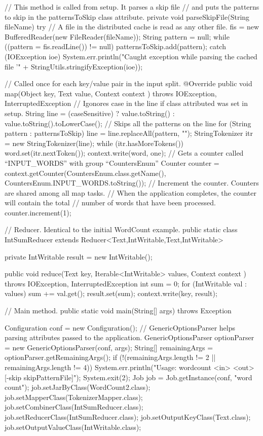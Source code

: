 \documentclass[11pt]{article}
\begin{document}
\begin{java}
{{    // This method is called from setup. It parses a skip file
    // and puts the patterns to skip in the patternsToSkip class attribute.   
    private void parseSkipFile(String fileName) {
      try {
        // A file in the distributed cache is read as any other file.
        fis = new BufferedReader(new FileReader(fileName));
        String pattern = null;
        while ((pattern = fis.readLine()) != null) {
          patternsToSkip.add(pattern);
        }
      } catch (IOException ioe) {
        System.err.println("Caught exception while parsing the cached file '"
            + StringUtils.stringifyException(ioe));
      }
    }

    // Called once for each key/value pair in the input split.
    @Override
    public void map(Object key, Text value, Context context
         ) throws IOException, InterruptedException {
      // Igonores case in the line if class attributed was set in setup.
      String line = (caseSensitive) ?
         value.toString() : value.toString().toLowerCase();
      // Skips all the patterns on the line
      for (String pattern : patternsToSkip) {
        line = line.replaceAll(pattern, "");
      }
      StringTokenizer itr = new StringTokenizer(line);
      while (itr.hasMoreTokens()) {
        word.set(itr.nextToken());
        context.write(word, one);
        // Gets a counter called ``INPUT_WORDS'' with group ``CountersEnum''
        Counter counter = context.getCounter(CountersEnum.class.getName(),
            CountersEnum.INPUT_WORDS.toString());
            // Increment the counter. Counters are shared among all map tasks.
            // When the application completes, the counter will contain the total
            // number of words that have been processed.
        counter.increment(1);
      }
    }
  }

  // Reducer. Identical to the initial WordCount example.     
  public static class IntSumReducer
       extends Reducer<Text,IntWritable,Text,IntWritable> {
    private IntWritable result = new IntWritable();

    public void reduce(Text key, Iterable<IntWritable> values,
                       Context context
                       ) throws IOException, InterruptedException {
      int sum = 0;
      for (IntWritable val : values) {
        sum += val.get();
      }
      result.set(sum);
      context.write(key, result);
    }
  }

  // Main method.
  public static void main(String[] args) throws Exception {
    Configuration conf = new Configuration();
    // GenericOptionsParser helps parsing attributes passed to the application.
    GenericOptionsParser optionParser = new GenericOptionsParser(conf, args);
    String[] remainingArgs = optionParser.getRemainingArgs();
    if (!(remainingArgs.length != 2 || remainingArgs.length != 4)) {
      System.err.println("Usage: wordcount <in> <out> [-skip skipPatternFile]");
      System.exit(2);
    }
    Job job = Job.getInstance(conf, "word count");
    job.setJarByClass(WordCount2.class);
    job.setMapperClass(TokenizerMapper.class);
    job.setCombinerClass(IntSumReducer.class);
    job.setReducerClass(IntSumReducer.class);
    job.setOutputKeyClass(Text.class);
    job.setOutputValueClass(IntWritable.class);

}}
\end{java}
\end{document}
